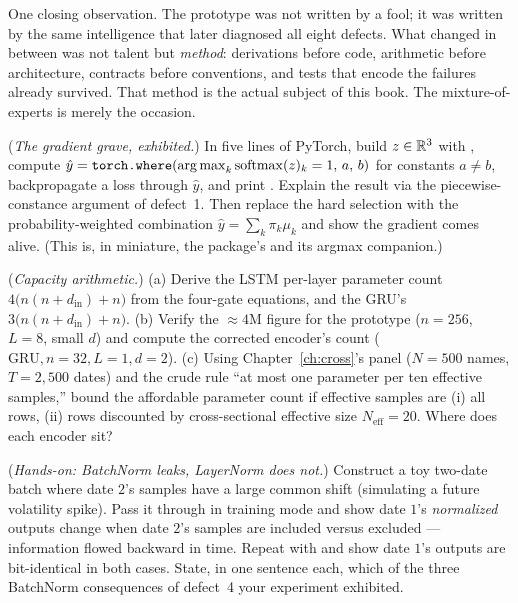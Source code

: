 One closing observation. The prototype was not written by a fool; it was
written by the same intelligence that later diagnosed all eight defects.
What changed in between was not talent but \emph{method}: derivations
before code, arithmetic before architecture, contracts before conventions,
and tests that encode the failures already survived. That method is the
actual subject of this book. The mixture-of-experts is merely the occasion.

\exercisehead

\begin{exercise}\label{ex:3-argmax}
(\emph{The gradient grave, exhibited.}) In five lines of PyTorch, build
$z \in \mathbb{R}^3$ with , compute
$\hat y = \texttt{torch.where}(\operatorname*{arg\,max}_k \mathrm{softmax}(z)_k = 1,\, a,\, b)$
for constants $a \ne b$, backpropagate a loss through $\hat y$, and print
. Explain the result via the piecewise-constance argument of
defect~1. Then replace the hard selection with the probability-weighted
combination $\hat y = \sum_k \pi_k \mu_k$ and show the gradient comes
alive. (This is, in miniature, the package's
 and its argmax companion.)
\end{exercise}

\begin{exercise}\label{ex:3-params}
(\emph{Capacity arithmetic.}) (a) Derive the LSTM per-layer parameter count
$4\bigl(n(n + d_{\text{in}}) + n\bigr)$ from the four-gate equations, and
the GRU's $3\bigl(n(n + d_{\text{in}}) + n\bigr)$. (b) Verify the
$\approx 4$M figure for the prototype ($n = 256$, $L = 8$, small $d$) and
compute the corrected encoder's count ($\text{GRU}, n = 32, L = 1, d = 2$).
(c) Using Chapter~\ref{ch:cross}'s panel ($N = 500$ names, $T = 2{,}500$
dates) and the crude rule ``at most one parameter per ten effective
samples,'' bound the affordable parameter count if effective samples are
(i) all rows, (ii) rows discounted by cross-sectional effective size
$N_{\text{eff}} = 20$. Where does each encoder sit?
\end{exercise}

\begin{exercise}\label{ex:3-bn}
(\emph{Hands-on: BatchNorm leaks, LayerNorm does not.}) Construct a toy
two-date batch where date $2$'s samples have a large common shift
(simulating a future volatility spike). Pass it through
 in training mode and show date $1$'s
\emph{normalized} outputs change when date $2$'s samples are included
versus excluded --- information flowed backward in time. Repeat with
 and show date $1$'s outputs are bit-identical in both
cases. State, in one sentence each, which of the three BatchNorm
consequences of defect~4 your experiment exhibited.
\end{exercise}

